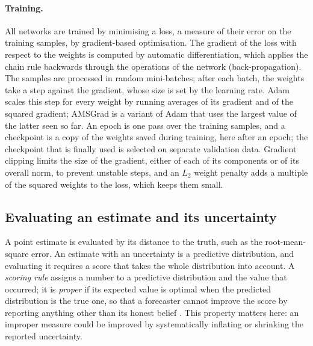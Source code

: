 \documentclass[english, 12pt, a4paper, elec, utf8, a-2b, online]{aaltothesis}
\begin{document}
\paragraph{Training.}
All networks are trained by minimising a loss, a measure of their error on the
training samples, by gradient-based optimisation. The gradient of the loss with
respect to the weights is computed by automatic differentiation, which applies
the chain rule backwards through the operations of the network
(back-propagation). The samples are processed in random mini-batches; after
each batch, the weights take a step against the gradient, whose size is set by
the learning rate. Adam \cite{kingma2015adam} scales this step for every weight
by running averages of its gradient and of the squared gradient; AMSGrad
\cite{reddi2018amsgrad} is a variant of Adam that uses the largest value of the
latter seen so far. An epoch is one pass over the training samples, and a
checkpoint is a copy of the weights saved during training, here after an
epoch; the checkpoint that is finally used is selected on separate validation
data. Gradient clipping limits the size of the gradient, either of each of its
components or of its overall norm, to prevent unstable steps, and an $L_2$
weight penalty adds a multiple of the squared weights to the loss, which keeps
them small.

\subsection{Evaluating an estimate and its uncertainty}
\label{sec:bg_scoring}

A point estimate is evaluated by its distance to the truth, such as the
root-mean-square error. An estimate with an uncertainty is a predictive
distribution, and evaluating it requires a score that takes the whole
distribution into account. A \emph{scoring rule} assigns a number to a
predictive distribution and the value that occurred; it is \emph{proper} if its
expected value is optimal when the predicted distribution is the true one, so
that a forecaster cannot improve the score by reporting anything other than its
honest belief \cite{gneiting2007scoring}. This property matters here: an
improper measure could be improved by systematically inflating or shrinking the
reported uncertainty.
\end{document}
